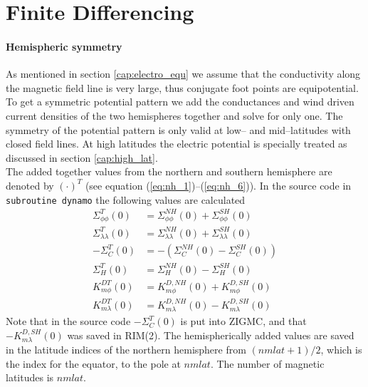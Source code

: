 \section{Finite Differencing}\label{chap:finitediff}
%
\paragraph{Hemispheric symmetry}
%
As mentioned in section \ref{cap:electro_equ} we assume that the conductivity 
along the magnetic field line is
very large, thus conjugate foot points are equipotential. To get a symmetric
potential pattern we add the conductances and wind driven current densities of
the two hemispheres together and solve for only one.
The symmetry of the potential pattern is only valid at low-- and
mid--latitudes with closed field lines. At high latitudes 
the electric potential is specially treated as
discussed in section \ref{cap:high_lat}. \\

%
The added together values from the northern and southern hemisphere 
 are denoted by $(\cdot)^T$ (see equation 
(\ref{eq:nh_1})--(\ref{eq:nh_6})). In the source code in
\texttt{subroutine dynamo} the following values are calculated
%
\begin{align}
   \Sigma_{\phi \phi}^T(0)      &= \Sigma_{\phi \phi}^{NH}(0) + \Sigma_{\phi \phi}^{SH}(0)\\
   \Sigma_{\lambda \lambda}^T(0)&=\Sigma_{\lambda \lambda}^{NH}(0)+ \Sigma_{\lambda \lambda}^{SH}(0) \\
  -\Sigma_{C}^T(0)&= -(\Sigma_{C}^{NH}(0)-\Sigma_{C}^{SH}(0))\\
   \Sigma_{H}^T(0)&=   \Sigma_{H}^{NH}(0)-\Sigma_{H}^{SH}(0)\\
   K_{m \phi}^{DT}(0)    &= K_{m \phi}^{D,NH}(0)+ K_{m \phi}^{D,SH}(0)\\
   K_{m \lambda}^{DT}(0) &= K_{m \lambda}^{D,NH}(0)-K_{m \lambda}^{D,SH}(0)
\end{align}
%
Note that in the source code $-\Sigma_{C}^T(0)$ is put into ZIGMC, and that
$-K_{m \lambda}^{D,SH}(0)$ was saved in RIM(2). The hemispherically added values are 
saved in the latitude indices of
the northern hemisphere from $(nmlat+1)/2$, which is the index for the equator, to
the pole at $nmlat$. The number of magnetic latitudes 
is $nmlat$.
%
